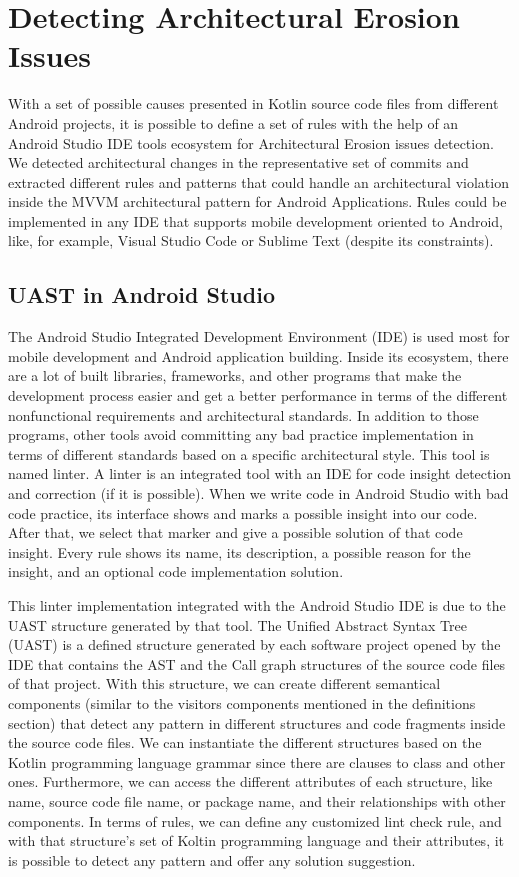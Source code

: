 \chapter{Detecting Architectural Erosion Issues}
\label{cha:detection}

With a set of possible causes presented in Kotlin source code files from different Android projects, it is possible to define a set of rules with the help of an Android Studio IDE tools ecosystem for Architectural Erosion issues detection. We detected architectural changes in the representative set of commits and extracted different rules and patterns that could handle an architectural violation inside the MVVM architectural pattern for Android Applications. Rules could be implemented in any IDE that supports mobile development oriented to Android, like, for example, Visual Studio Code or Sublime Text (despite its constraints).


\section{UAST in Android Studio}
The Android Studio  Integrated Development Environment (IDE) is used most for mobile development and Android application building. Inside its ecosystem, there are a lot of built libraries, frameworks, and other programs that make the development process easier and get a better performance in terms of the different nonfunctional requirements and architectural standards. In addition to those programs, other tools avoid committing any bad practice implementation in terms of different standards based on a specific architectural style. This tool is named linter. A linter is an integrated tool with an IDE for code insight detection and correction  (if it is possible). When we write code in Android Studio with bad code practice, its interface shows and marks a possible insight into our code. After that, we select that marker and give a possible solution of that code insight. Every rule shows its name, its description, a possible reason for the insight, and an optional code implementation solution.

This linter implementation integrated with the Android Studio IDE is due to the UAST structure generated by that tool. The Unified Abstract Syntax Tree (UAST) is a defined structure generated by each software project opened by the IDE that contains the AST and the Call graph structures of the source code files of that project. With this structure, we can create different semantical components (similar to the visitors components mentioned in the definitions section) that detect any pattern in different structures and code fragments inside the source code files. We can instantiate the different structures based on the Kotlin programming language grammar since there are clauses to class and other ones. Furthermore, we can access the different attributes of each structure, like name, source code file name, or package name, and their relationships with other components. In terms of rules, we can define any customized lint check rule, and with that structure's set of Koltin programming language and their attributes, it is possible to detect any pattern and offer any solution suggestion.

